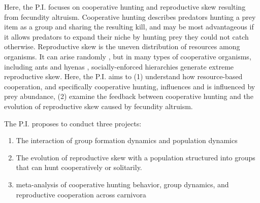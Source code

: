 Here, the P.I. focuses on cooperative hunting and reproductive skew resulting from fecundity altruism. Cooperative hunting describes predators hunting a prey item as a group and sharing the resulting kill, and may be most advantageous if it allows predators to expand their niche by hunting prey they could not catch otherwise. Reproductive skew is the uneven distribution of resources among organisms. It can arise randomly \cite{steiner_neutral_2012, tuljapurkar_skewed_2020}, but in many types of cooperative organisms, including ants \cite{holldobler1990ants} and hyenas \cite{holekamp_rank_1996}, socially-enforced hierarchies generate extreme reproductive skew. Here, the P.I. aims to (1) understand how resource-based cooperation, and specifically cooperative hunting, influences and is influenced by prey abundance, (2) examine the feedback between cooperative hunting and the evolution of reproductive skew caused by fecundity altruism. 

The P.I. proposes to conduct three projects:
\begin{enumerate}
\item The interaction of group formation dynamics and population dynamics
\item The evolution of reproductive skew with a population structured into groups that can hunt cooperatively or solitarily.
\item meta-analysis of cooperative hunting behavior, group dynamics, and reproductive cooperation across carnivora
\end{enumerate}


